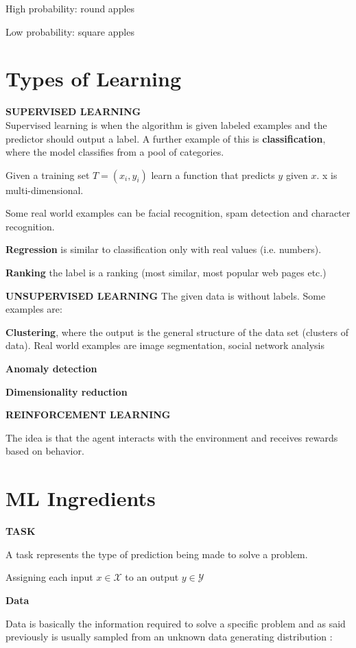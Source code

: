 \documentclass[oneside]{book}
\theoremstyle{definition}
\begin{document}
High probability: round apples

Low probability: square apples

\section{Types of Learning}
\textbf{SUPERVISED LEARNING}\\
Supervised learning is when the algorithm is given labeled examples and the predictor should output a label. A further example of this is \textbf{classification}, where the model classifies from a pool of categories. 

Given a training set $T = {(x_i, y_i)}$ learn a function that predicts $y$ given $x$. x is multi-dimensional.

Some real world examples can be facial recognition, spam detection and character recognition. 

\textbf{Regression} is similar to classification only with real values (i.e. numbers).

\textbf{Ranking} the label is a ranking (most similar, most popular web pages etc.)


\textbf{UNSUPERVISED LEARNING}
The given data is without labels. 
Some examples are: 

\textbf{Clustering}, where the output is the general structure of the data set (clusters of data). Real world examples are image segmentation, social network analysis 

\textbf{Anomaly detection}

\textbf{Dimensionality reduction} 

\textbf{REINFORCEMENT LEARNING}

The idea is that the agent interacts with the environment and receives rewards based on behavior. 

\section{ML Ingredients}

\textbf{TASK}

A task represents the type of prediction being made to solve a problem. 

Assigning each input $ x \in \mathscr{X}$ to an output $y \in \mathscr{Y}$

\textbf{Data}

Data is basically the information required to solve a specific problem and as said previously is usually sampled from an unknown data generating distribution :
\end{document}
